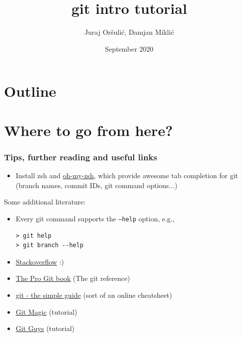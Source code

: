 \documentclass[xcolor=dvipsnames]{beamer}%
\title[git basics]
{git intro tutorial}
\author[Or\v{s}uli\'{c}, Mikli\'{c}]{Juraj Or\v{s}uli\'{c}, Damjan Mikli\'{c}}
\institute[Romb]{Romb Technologies}
\date[]{September 2020}
\begin{document}

\begin{frame}
	\titlepage
\end{frame}

\section*{Outline}
\begin {frame}
	\tableofcontents
\end{frame}












\section{Where to go from here?}

\begin{frame}[fragile]

\frametitle{Tips, further reading and useful links}

	\begin{itemize}	
	\item Install zsh and \href{http://ohmyz.sh/}{oh-my-zsh}, which provide awesome tab completion for git (branch names, commit IDs, git command options...)
	\end{itemize}
	
Some additional literature:
	\begin{itemize}
	\item Every git command supports the \texttt{--help} option, e.g.,
	\begin{verbatim}
> git help
> git branch --help
	\end{verbatim}
	\item \href{http://stackoverflow.com/questions/tagged/git}{Stackoverflow} :)
	\item \href{https://git-scm.com/book/en/v2}{The Pro Git book} (The git reference)
	\item \href{http://rogerdudler.github.io/git-guide/}{git - the simple guide} (sort of an online cheatsheet)
	\item \href{http://www-cs-students.stanford.edu/~blynn/gitmagic/}{Git Magic} (tutorial) 
	\item \href{http://www.gitguys.com/}{Git Guys} (tutorial)
	\end{itemize}
	
\end{frame}
\end{document}
